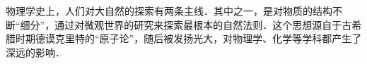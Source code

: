 
物理学史上，人们对大自然的探索有两条主线．其中之一，是对物质的结构不断“细分”，通过对微观世界的研究来探索最根本的自然法则．这个思想源自于古希腊时期德谟克里特的“原子论”，随后被发扬光大，对物理学、化学等学科都产生了深远的影响．
